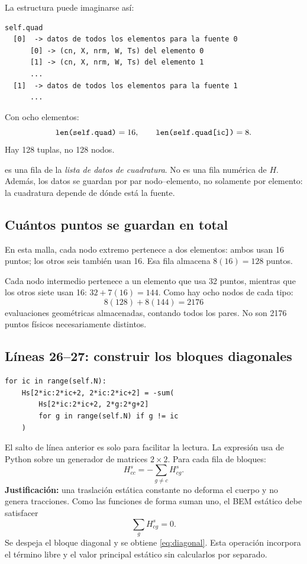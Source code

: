 \documentclass[11pt,a4paper]{article}
\numberwithin{equation}{section}
\DeclareRobustCommand{\code}[1]{\texttt{\detokenize{#1}}}
\begin{document}
La estructura puede imaginarse as\'i:
\begin{lstlisting}[language={}]
self.quad
  [0]  -> datos de todos los elementos para la fuente 0
      [0] -> (cn, X, nrm, W, Ts) del elemento 0
      [1] -> (cn, X, nrm, W, Ts) del elemento 1
      ...
  [1]  -> datos de todos los elementos para la fuente 1
      ...
\end{lstlisting}
Con ocho elementos:
\begin{equation}
 \code{len(self.quad)}=16,\qquad
 \code{len(self.quad[ic])}=8.
\end{equation}
Hay 128 tuplas, no 128 nodos.

\begin{cuidado}
\code{fila} es una fila de la \emph{lista de datos de cuadratura}.
No es una fila num\'erica de $H$.
Adem\'as, los datos se guardan por par nodo--elemento, no solamente
por elemento: la cuadratura depende de d\'onde est\'a la fuente.
\end{cuidado}

\subsection{Cu\'antos puntos se guardan en total}
En esta malla, cada nodo extremo pertenece a dos elementos:
ambos usan 16 puntos; los otros seis tambi\'en usan 16.
Esa fila almacena $8(16)=128$ puntos.

Cada nodo intermedio pertenece a un elemento que usa 32 puntos,
mientras que los otros siete usan 16:
$32+7(16)=144$.
Como hay ocho nodos de cada tipo:
\begin{equation}
 8(128)+8(144)=2176
\end{equation}
evaluaciones geom\'etricas almacenadas, contando todos los pares.
No son 2176 puntos f\'isicos necesariamente distintos.

\subsection{L\'ineas 26--27: construir los bloques diagonales}
\begin{lstlisting}
for ic in range(self.N):
    Hs[2*ic:2*ic+2, 2*ic:2*ic+2] = -sum(
        Hs[2*ic:2*ic+2, 2*g:2*g+2]
        for g in range(self.N) if g != ic
    )
\end{lstlisting}
El salto de l\'inea anterior es solo para facilitar la lectura.
La expresi\'on usa \code{sum} de Python sobre un generador de
matrices $2\times2$.
Para cada fila de bloques:
\begin{equation}
 \boxed{H^s_{cc}=-\sum_{g\ne c}H^s_{cg}.}
 \label{eq:diagonal}
\end{equation}
\textbf{Justificaci\'on:} una traslaci\'on est\'atica constante no
deforma el cuerpo y no genera tracciones. Como las funciones de forma
suman uno, el BEM est\'atico debe satisfacer
\begin{equation}
 \sum_gH^s_{cg}=0.
\end{equation}
Se despeja el bloque diagonal y se obtiene \eqref{eq:diagonal}.
Esta operaci\'on incorpora el t\'ermino libre y el valor principal
est\'atico sin calcularlos por separado.
\end{document}
